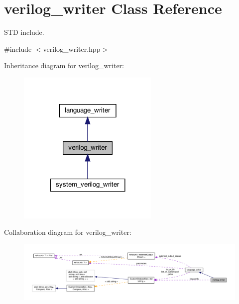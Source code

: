 \hypertarget{classverilog__writer}{}\section{verilog\+\_\+writer Class Reference}
\label{classverilog__writer}


S\+TD include.  




{\ttfamily \#include $<$verilog\+\_\+writer.\+hpp$>$}



Inheritance diagram for verilog\+\_\+writer\+:
\nopagebreak
\begin{figure}[H]
\begin{center}
\leavevmode
\includegraphics[width=192pt]{dd/d23/classverilog__writer__inherit__graph}
\end{center}
\end{figure}


Collaboration diagram for verilog\+\_\+writer\+:
\nopagebreak
\begin{figure}[H]
\begin{center}
\leavevmode
\includegraphics[width=350pt]{d9/d20/classverilog__writer__coll__graph}
\end{center}
\end{figure}

